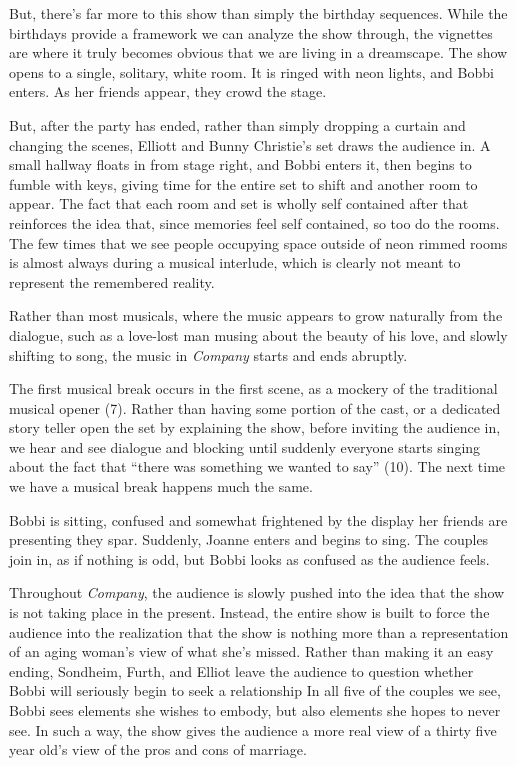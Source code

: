 \documentclass[12pt]{article}[titlepage]
\newcommand{\say}[1]{``#1''}
\newcommand{\1}{\={a}}
\newcommand{\2}{\={e}}
\newcommand{\3}{\={\i}}
\newcommand{\4}{\=o}
\newcommand{\5}{\=u}
\newcommand{\6}{\={A}}
\renewcommand{\,}{\textsuperscript{,}}
\begin{document}
But, there's far more to this show than simply the birthday sequences.
While the birthdays provide a framework we can analyze the show through, the vignettes are where it truly becomes obvious that we are living in a dreamscape.
The show opens to a single, solitary, white room.
It is ringed with neon lights, and Bobbi enters.
As her friends appear, they crowd the stage.

But, after the party has ended, rather than simply dropping a curtain and changing the scenes, Elliott and Bunny Christie's set draws the audience in.
A small hallway floats in from stage right, and Bobbi enters it, then begins to fumble with keys, giving time for the entire set to shift and another room to appear.
The fact that each room and set is wholly self contained after that reinforces the idea that, since memories feel self contained, so too do the rooms.
The few times that we see people occupying space outside of neon rimmed rooms is almost always during a musical interlude, which is clearly not meant to represent the remembered reality.

Rather than most musicals, where the music appears to grow naturally from the dialogue, such as a love-lost man musing about the beauty of his love, and slowly shifting to song, the music in \textit{Company} starts and ends abruptly.

The first musical break occurs in the first scene, as a mockery of the traditional musical opener (7).
Rather than having some portion of the cast, or a dedicated story teller open the set by explaining the show, before inviting the audience in, we hear and see dialogue and blocking until suddenly everyone starts singing about the fact that \say{there was something we wanted to say} (10).
The next time we have a musical break happens much the same.

Bobbi is sitting, confused and somewhat frightened by the display her friends are presenting they spar.
Suddenly, Joanne enters and begins to sing.
The couples join in, as if nothing is odd, but Bobbi looks as confused as the audience feels.

Throughout \textit{Company}, the audience is slowly pushed into the idea that the show is not taking place in the present.
Instead, the entire show is built to force the audience into the realization that the show is nothing more than a representation of an aging woman's view of what she's missed.
Rather than making it an easy ending, Sondheim, Furth, and Elliot leave the audience to question whether Bobbi will seriously begin to seek a relationship
In all five of the couples we see, Bobbi sees elements she wishes to embody, but also elements she hopes to never see.
In such a way, the show gives the audience a more real view of a thirty five year old's view of the pros and cons of marriage.
\end{document}
